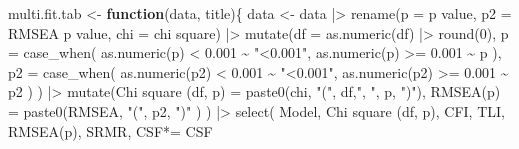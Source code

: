 \documentclass[
]{article}
\newenvironment{Shaded}{\begin{snugshade}}{\end{snugshade}}
\newcommand{\AttributeTok}[1]{\textcolor[rgb]{0.77,0.63,0.00}{#1}}
\newcommand{\ControlFlowTok}[1]{\textcolor[rgb]{0.13,0.29,0.53}{\textbf{#1}}}
\newcommand{\DecValTok}[1]{\textcolor[rgb]{0.00,0.00,0.81}{#1}}
\newcommand{\FloatTok}[1]{\textcolor[rgb]{0.00,0.00,0.81}{#1}}
\newcommand{\FunctionTok}[1]{\textcolor[rgb]{0.00,0.00,0.00}{#1}}
\newcommand{\NormalTok}[1]{#1}
\newcommand{\OtherTok}[1]{\textcolor[rgb]{0.56,0.35,0.01}{#1}}
\newcommand{\SpecialCharTok}[1]{\textcolor[rgb]{0.00,0.00,0.00}{#1}}
\newcommand{\StringTok}[1]{\textcolor[rgb]{0.31,0.60,0.02}{#1}}
\begin{document}
\begin{Shaded}
\begin{Highlighting}[]
\NormalTok{multi.fit.tab }\OtherTok{\textless{}{-}} \ControlFlowTok{function}\NormalTok{(data, title)\{}
\NormalTok{data }\OtherTok{\textless{}{-}}\NormalTok{ data }\SpecialCharTok{|\textgreater{}} 
  \FunctionTok{rename}\NormalTok{(}\AttributeTok{p =} \StringTok{\textquotesingle{}p value\textquotesingle{}}\NormalTok{,}
         \AttributeTok{p2 =} \StringTok{\textquotesingle{}RMSEA p value\textquotesingle{}}\NormalTok{,}
         \AttributeTok{chi =} \StringTok{\textquotesingle{}chi square\textquotesingle{}}\NormalTok{) }\SpecialCharTok{|\textgreater{}} 
  \FunctionTok{mutate}\NormalTok{(}\AttributeTok{df =} \FunctionTok{as.numeric}\NormalTok{(df) }\SpecialCharTok{|\textgreater{}} \FunctionTok{round}\NormalTok{(}\DecValTok{0}\NormalTok{),}
         \AttributeTok{p =} \FunctionTok{case\_when}\NormalTok{(}
           \FunctionTok{as.numeric}\NormalTok{(p) }\SpecialCharTok{\textless{}} \FloatTok{0.001} \SpecialCharTok{\textasciitilde{}} \StringTok{"\textless{}0.001"}\NormalTok{,}
           \FunctionTok{as.numeric}\NormalTok{(p) }\SpecialCharTok{\textgreater{}=} \FloatTok{0.001} \SpecialCharTok{\textasciitilde{}}\NormalTok{ p}
\NormalTok{           ),}
         \AttributeTok{p2 =} \FunctionTok{case\_when}\NormalTok{(}
           \FunctionTok{as.numeric}\NormalTok{(p2) }\SpecialCharTok{\textless{}} \FloatTok{0.001} \SpecialCharTok{\textasciitilde{}} \StringTok{"\textless{}0.001"}\NormalTok{,}
           \FunctionTok{as.numeric}\NormalTok{(p2) }\SpecialCharTok{\textgreater{}=} \FloatTok{0.001} \SpecialCharTok{\textasciitilde{}}\NormalTok{ p2}
\NormalTok{           )}
\NormalTok{         ) }\SpecialCharTok{|\textgreater{}}
  \FunctionTok{mutate}\NormalTok{(}\StringTok{\textquotesingle{}Chi square (df, p)\textquotesingle{}} \OtherTok{=} 
           \FunctionTok{paste0}\NormalTok{(chi, }\StringTok{"("}\NormalTok{, df,}\StringTok{", "}\NormalTok{, p, }\StringTok{")"}\NormalTok{),}
         \StringTok{\textquotesingle{}RMSEA(p)\textquotesingle{}}           \OtherTok{=} 
           \FunctionTok{paste0}\NormalTok{(RMSEA, }\StringTok{"("}\NormalTok{, p2, }\StringTok{")"}
\NormalTok{                  )}
\NormalTok{         ) }\SpecialCharTok{|\textgreater{}} 
  \FunctionTok{select}\NormalTok{(}
\NormalTok{    Model,}
    \StringTok{\textquotesingle{}Chi square (df, p)\textquotesingle{}}\NormalTok{, }
\NormalTok{    CFI, TLI,}
    \StringTok{\textquotesingle{}RMSEA(p)\textquotesingle{}}\NormalTok{, }
\NormalTok{    SRMR, }
    \StringTok{\textquotesingle{}CSF*\textquotesingle{}}\OtherTok{=}\NormalTok{ CSF}

\end{Highlighting}
\end{Shaded}
\end{document}
